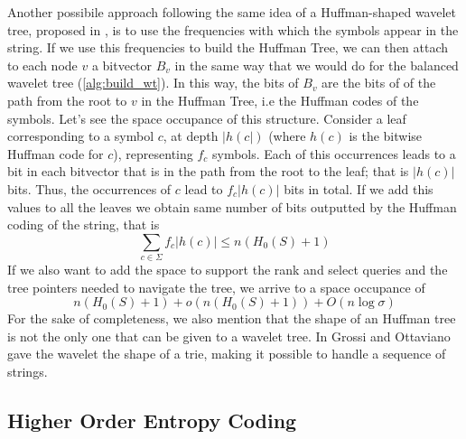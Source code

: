 \noindent Another possibile approach following the same idea of a Huffman-shaped wavelet tree, proposed in \cite{makinen2004new}, is to use the frequencies with which the symbols appear in the string. If we use this frequencies to build the Huffman Tree, we can then attach to each node $v$ a bitvector $B_v$ in the same way that we would do for the balanced wavelet tree (\ref{alg:build_wt}). In this way, the bits of $B_v$ are the bits of of the path from the root to $v$ in the Huffman Tree, i.e the Huffman codes of the symbols. Let's see the space occupance of this structure. Consider a leaf corresponding to a symbol $c$, at depth $|h(c|)$ (where $h(c)$ is the bitwise Huffman code for $c$), representing $f_c$ symbols. Each of this occurrences leads to a bit in each bitvector that is in the path from the root to the leaf; that is $|h(c)|$ bits. Thus, the occurrences of $c$ lead to $f_c |h(c)|$ bits in total. If we add this values to all the leaves we obtain same number of bits outputted by the Huffman coding of the string, that is
\begin{equation}
    \sum_{c \in \Sigma} f_c |h(c)| \leq n(H_0(S) + 1)
\end{equation}
If we also want to add the space to support the rank and select queries and the tree pointers needed to navigate the tree, we arrive to a space occupance of
\begin{equation}
    n(H_0(S) + 1) + o(n(H_0(S) + 1)) + O(n \log \sigma)
\end{equation}
For the sake of completeness, we also mention that the shape of an Huffman tree is not the only one that can be given to a wavelet tree. In \cite{grossi2012wavelet} Grossi and Ottaviano gave the wavelet the shape of a trie, making it possible to handle a sequence of strings.

\subsection{Higher Order Entropy Coding}

